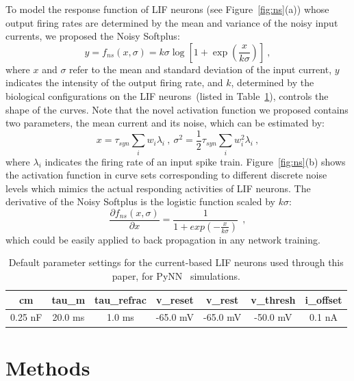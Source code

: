 \documentclass{article}
\begin{document}
To model the response function of LIF neurons (see Figure~\ref{fig:ns}(a)) whose output firing rates are determined by the mean and variance of the noisy input currents, we proposed the Noisy Softplus:
\begin{equation}
y = f_{ns}(x, \sigma) = k \sigma \log [1 + \exp(\frac{x}{k \sigma})]~,
\label{equ:nsp}
\end{equation}
where $x$ and $\sigma$ refer to the mean and standard deviation of the input current, $y$ indicates the intensity of the output firing rate, and $k$, determined by the biological configurations on the LIF neurons~(listed in Table~\ref{tbl:pynnConfig}), controls the shape of the curves.
Note that the novel activation function we proposed contains two parameters, the mean current and its noise, which can be estimated by:
\begin{equation}
x = \tau_{syn}\sum_i w_i\lambda_{i}~, ~\sigma^2=\frac{1}{2}\tau_{syn}\sum_i w_i^2\lambda_{i}~,
\label{equ:distr}
\end{equation}
where $\lambda_i$ indicates the firing rate of an input spike train.
Figure~\ref{fig:ns}(b) shows the activation function in curve sets corresponding to different discrete noise levels which mimics the actual responding activities of LIF neurons.
The derivative of the Noisy Softplus is the logistic function scaled by $k\sigma$:
\begin{equation}
\frac{\partial f_{ns}(x,\sigma)}{\partial x} = \frac{1}{1+exp(-\frac{x}{k\sigma})}~~,
\label{equ:logist}
\end{equation}	
which could be easily applied to back propagation in any network training.

\begin{table}[thb]
	\centering
	\caption{\label{tbl:pynnConfig}Default parameter settings for the current-based LIF neurons used through this paper, for PyNN~\cite{davison2008pynn} simulations.}
	\bgroup
	\def\arraystretch{1.4}
	\begin{tabular}{c c c c c c c}
		cm & tau\_m & tau\_refrac & v\_reset & v\_rest& v\_thresh & i\_offset \\
		\hline
		0.25 nF & 20.0 ms & 1.0 ms & -65.0 mV & -65.0 mV & -50.0 mV &  0.1 nA 
	\end{tabular}
	\egroup
\end{table}


\section{Methods}	
\label{sec:meth}
\end{document}
